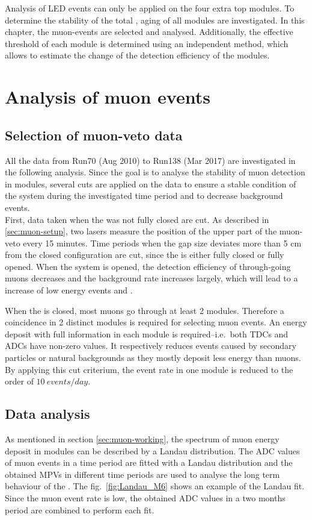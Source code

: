
Analysis of LED events can only be applied on the four extra top modules. To determine the stability of the total \mvs, aging of all modules are investigated. In this chapter, the muon-events are selected and analysed. Additionally, the effective threshold of each module is determined using an independent method, which allows to estimate the change of the detection efficiency of the modules.

\section{Analysis of muon events}

\subsection{Selection of muon-veto data}
All the data from Run70 (Aug 2010) to Run138 (Mar 2017) are investigated in the following analysis. Since the goal is to analyse the stability of muon detection in modules, several cuts are applied on the data to ensure a stable condition of the system during the investigated time period and to decrease background events.\\
First, data taken when the \mvs{} was not fully closed are cut. As described in \ref{sec:muon-setup}, two lasers measure the position of the upper part of the muon-veto every 15 minutes. Time periods when the gap size deviates more than 5 cm from the closed configuration are cut, since the \mvs{} is either fully closed or fully opened. When the system is opened, the detection efficiency of through-going muons decreases and the background rate increases largely, which will lead to a increase of low energy events and .

When the \mvs{} is closed, most muons go through at least 2 modules. Therefore a coincidence in 2 distinct modules is required for selecting muon events. An energy deposit with full information in each module is required--i.e.\ both TDCs and ADCs have non-zero values. It respectively reduces events caused by secondary particles or natural backgrounds as they mostly deposit less energy than muons. By applying this cut criterium, the event rate in one module is reduced to the order of $\SI{10}{events/day}$.

\subsection{Data analysis}
As mentioned in section \ref{sec:muon-working}, the spectrum of muon energy deposit in modules can be described by a Landau distribution. The ADC values of muon events in a time period are fitted with a Landau distribution and the obtained MPVs in different time periods are used to analyse the long term behaviour of the \mvs. The fig.\ \ref{fig:Landau_M6} shows an example of the Landau fit. Since the muon event rate is low, the obtained ADC values in a two months period are combined to perform each fit.

